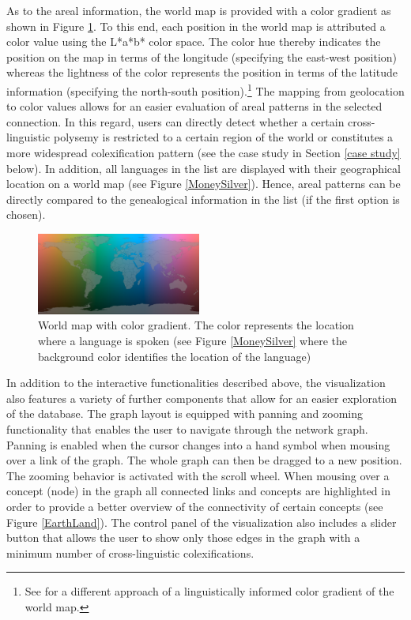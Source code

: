 As to the areal information, the world map is provided with a color gradient as shown in Figure \ref{World map}. To this end, each position in the world map is attributed a color value using the L*a*b* color space. The color hue thereby indicates the position on the map in terms of the longitude (specifying the east-west position) whereas the lightness of the color represents the position in terms of the latitude information (specifying the north-south position).\footnote{See  for a different approach of a linguistically informed color gradient of the world map.}
The mapping from geolocation to color values allows for an easier evaluation of areal patterns in the selected connection. In this regard, users can directly detect whether a certain cross-linguistic polysemy is restricted to a certain region of the world or constitutes a more widespread colexification pattern (see the case study in Section \ref{case study} below). In addition, all languages in the list are displayed with their geographical location on a world map (see Figure \ref{MoneySilver}). Hence, areal patterns can be directly compared to the genealogical information in the list (if the first option is chosen).

\begin{figure}[htbp]
\begin{center}
\includegraphics[width=0.48\textwidth]{img/ColorScaleWorld.png}
\caption{World map with color gradient. The color represents the location where a language is spoken (see Figure \ref{MoneySilver} where the background color identifies the location of the language)
}
\label{World map}
\end{center}
\end{figure}



In addition to the interactive functionalities described above, the visualization also features a variety of further components that allow for an easier exploration of the database. The graph layout is equipped with panning and zooming functionality that enables the user to navigate through the network graph. Panning is enabled when the cursor changes into a hand symbol when mousing over a link of the graph. The whole graph can then be dragged to a new position. The zooming behavior is activated with the scroll wheel. 
When mousing over a concept (node) in the graph all connected links and concepts are highlighted
in order to provide a better overview of the connectivity of certain concepts (see Figure \ref{EarthLand}). The control panel of the visualization also includes a slider button that allows the user to show only those edges in the graph with a minimum number of cross-linguistic colexifications. 

